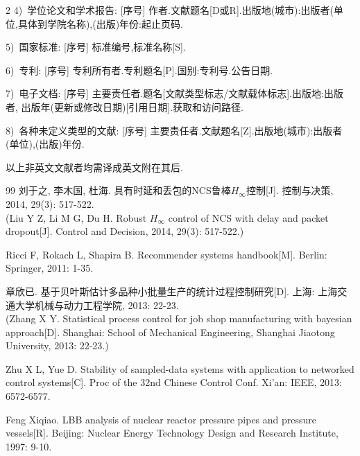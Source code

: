 \documentclass{ctacn}%
\begin{document}
\begin{multicols}{2}
4)~学位论文和学术报告:
[序号] 作者.\;文献题名[D或R].\;出版地(城市):出版者(单位,具体到学院名称),(出版)年份:起止页码.

5)~国家标准:
[序号] 标准编号,标准名称[S].

6)~专利:
[序号] 专利所有者.\;专利题名[P].\;国别:专利号.\;公告日期.

7)~电子文档:
[序号] 主要责任者.\;题名[文献类型标志/文献载体标志].\;出版地:出版者, 出版年(更新或修改日期)[引用日期].\;获取和访问路径.

8)~各种未定义类型的文献: [序号] 主要责任者.\;文献题名[Z].\;出版地(城市):出版者(单位),(出版)年份.

以上非英文文献者均需译成英文附在其后.



\begin{thebibliography}{99}
\addtolength{\itemsep}{-0.7em}
刘于之, 李木国, 杜海. 具有时延和丢包的NCS鲁棒$H_{\infty}$控制[J]. 控制与决策, 2014, 29(3): 517-522.\\
(Liu Y Z, Li M G, Du H. Robust $H_{\infty}$ control of NCS with delay and packet dropout[J]. Control and Decision, 2014, 29(3): 517-522.)

Ricci F, Rokach L, Shapira B. Recommender systems handbook[M]. Berlin: Springer, 2011: 1-35.

章欣已. 基于贝叶斯估计多品种小批量生产的统计过程控制研究[D]. 上海: 上海交通大学机械与动力工程学院, 2013: 22-23.\\
(Zhang X Y. Statistical process control for job shop manufacturing with bayesian approach[D]. Shanghai: School of Mechanical Engineering, Shanghai Jiaotong University, 2013: 22-23.)

Zhu X L, Yue D. Stability of sampled-data systems with application to networked control systems[C]. Proc of the 32nd Chinese Control Conf. Xi'an: IEEE, 2013: 6572-6577.

Feng Xiqiao. LBB analysis of nuclear reactor pressure pipes and pressure vessels[R]. Beijing: Nuclear Energy Technology Design and Research Institute, 1997: 9-10.


\end{thebibliography}
\end{multicols}
\end{document}
